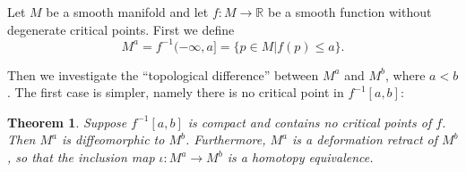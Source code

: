 \documentclass[a4paper,11pt,reqno]{amsart}
\newtheorem{thm}{Theorem}[section]
\newcommand{\RR}{\mathbb{R}}      %
\begin{document}
Let $M$ be a smooth manifold and let $f: M \to \RR$ be a smooth function without
degenerate critical points. First we define
\begin{equation}
  M^a = f^{-1}(-\infty, a] = \{ p \in M | f(p) \le a \}.
\end{equation}

Then we investigate the ``topological difference'' between $M^a$ and $M^b$,
where $a < b$. The first case is simpler, namely there is no critical point in
$f^{-1}[a,b]$:

\begin{thm}
  Suppose $f^{-1}[a,b]$ is compact and contains no critical points of $f$. Then
  $M^a$ is diffeomorphic to $M^b$. Furthermore, $M^a$ is a deformation retract
  of $M^b$, so that the inclusion map $\iota : M^a \to M^b$ is a homotopy
  equivalence.
\end{thm}
\end{document}
